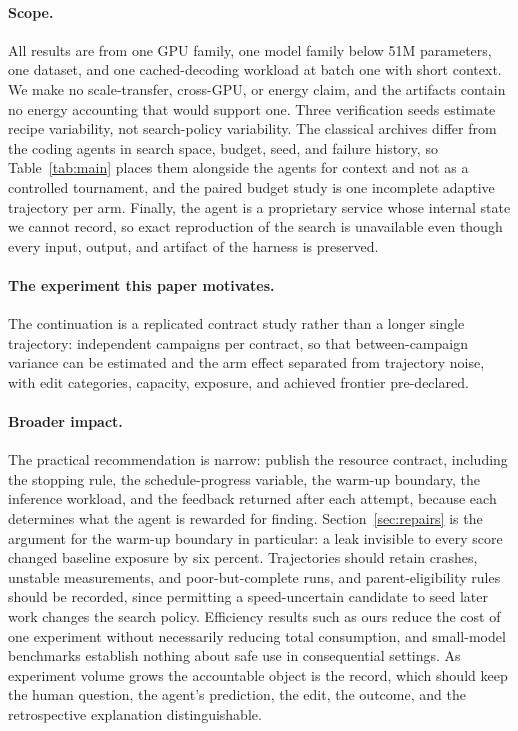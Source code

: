 \documentclass{article}
\begin{document}
\paragraph{Scope.} All results are from one GPU family, one model family below 51M parameters, one dataset, and one cached-decoding workload at batch one with short context. We make no scale-transfer, cross-GPU, or energy claim, and the artifacts contain no energy accounting that would support one. Three verification seeds estimate recipe variability, not search-policy variability. The classical archives differ from the coding agents in search space, budget, seed, and failure history, so Table~\ref{tab:main} places them alongside the agents for context and not as a controlled tournament, and the paired budget study is one incomplete adaptive trajectory per arm. Finally, the agent is a proprietary service whose internal state we cannot record, so exact reproduction of the search is unavailable even though every input, output, and artifact of the harness is preserved.

\paragraph{The experiment this paper motivates.} The continuation is a replicated contract study rather than a longer single trajectory: independent campaigns per contract, so that between-campaign variance can be estimated and the arm effect separated from trajectory noise, with edit categories, capacity, exposure, and achieved frontier pre-declared.

\paragraph{Broader impact.} The practical recommendation is narrow: publish the resource contract, including the stopping rule, the schedule-progress variable, the warm-up boundary, the inference workload, and the feedback returned after each attempt, because each determines what the agent is rewarded for finding. Section~\ref{sec:repairs} is the argument for the warm-up boundary in particular: a leak invisible to every score changed baseline exposure by six percent. Trajectories should retain crashes, unstable measurements, and poor-but-complete runs, and parent-eligibility rules should be recorded, since permitting a speed-uncertain candidate to seed later work changes the search policy. Efficiency results such as ours reduce the cost of one experiment without necessarily reducing total consumption, and small-model benchmarks establish nothing about safe use in consequential settings. As experiment volume grows the accountable object is the record, which should keep the human question, the agent's prediction, the edit, the outcome, and the retrospective explanation distinguishable.
\end{document}
